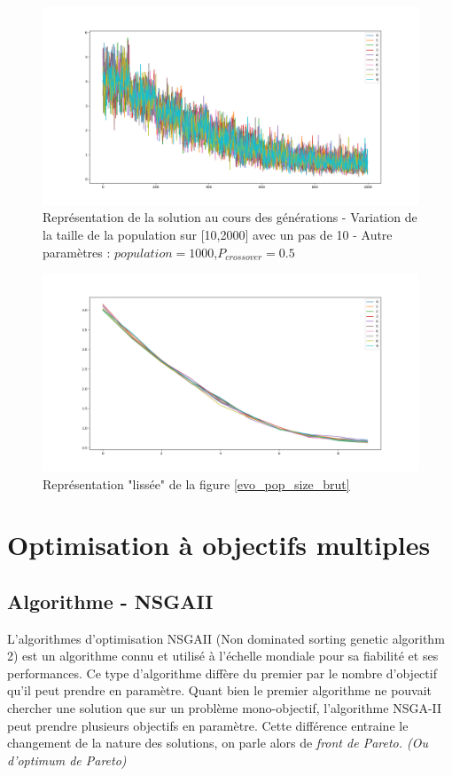 \documentclass[12pt]{report}
\begin{document}
      \begin{figure}[h]
        \centering
        \includegraphics[width=15cm]{img/evo_mutation_brut.png}
        \caption{Représentation de la solution au cours des générations - Variation de la taille de la population sur [10,2000] avec un pas de 10 - Autre paramètres : $population = 1000$,$P_{crossover} = 0.5$}
        \label{evo_mutation_brut}
      \end{figure}

      \begin{figure}[!]
        \centering
        \includegraphics[width=15cm]{img/evo_mutation_moy.png}
        \caption{Représentation "lissée" de la figure \ref{evo_pop_size_brut}}
        \label{evo_mutation_moy}
      \end{figure}






  \chapter{Optimisation à objectifs multiples}
    \section{Algorithme - NSGAII}
    L'algorithmes d'optimisation NSGAII (Non dominated sorting genetic algorithm 2) est un algorithme connu et utilisé à l'échelle mondiale pour sa fiabilité et ses performances. Ce type d'algorithme diffère du premier par le nombre d'objectif qu'il peut prendre en paramètre. Quant bien le premier algorithme ne pouvait chercher une solution que sur un problème mono-objectif, l'algorithme NSGA-II peut prendre plusieurs objectifs en paramètre. Cette différence entraine le changement de la nature des solutions, on parle alors de \emph{front de Pareto. (Ou d'optimum de Pareto)}\\
\end{document}
